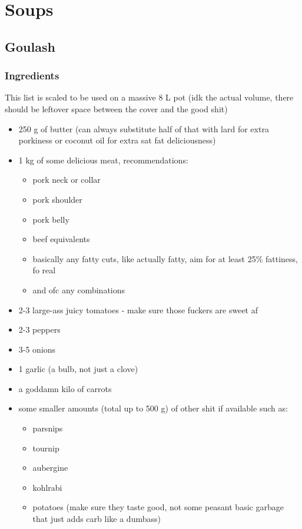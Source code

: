 \documentclass[10pt]{article}
\begin{document}
\section{Soups}%
\label{sec:soups}

\subsection{Goulash}%
\label{sub:goulash}
\subsubsection{Ingredients}%
\label{ssub:ingredients}
This list is scaled to be used on a massive 8 L pot (idk the actual volume, there should be leftover space between the cover and the good shit)
\begin{itemize}
	\item 250 g of butter (can always substitute half of that with lard for extra porkiness or coconut oil for extra sat fat deliciousness)	
	\item 1 kg of some delicious meat, recommendations:
		\begin{itemize}
			\item pork neck or collar
			\item pork shoulder
			\item pork belly
			\item beef equivalents
			\item basically any fatty cuts, like actually fatty, aim for at least 25\% fattiness, fo real
			\item and ofc any combinations
		\end{itemize}
	\item 2-3 large-ass juicy tomatoes - make sure those fuckers are sweet af
	\item 2-3 peppers
	\item 3-5 onions
	\item 1 garlic (a bulb, not just a clove)
	\item a goddamn kilo of carrots
	\item some smaller amounts (total up to 500 g) of other shit if available such as:
		\begin{itemize}
			\item parsnips
			\item tournip
			\item aubergine
			\item kohlrabi
			\item potatoes (make sure they taste good, not some peasant basic garbage that just adds carb like a dumbass)

\end{itemize}
\end{itemize}
\end{document}
